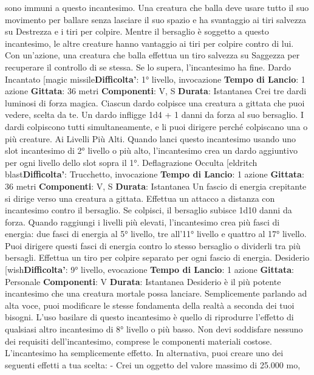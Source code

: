 \begin{multicols}{2}
sono immuni a questo incantesimo.
Una creatura che balla deve usare tutto il suo
movimento per ballare senza lasciare il suo spazio e ha
svantaggio ai tiri salvezza su Destrezza e i tiri per
colpire. Mentre il bersaglio è soggetto a questo
incantesimo, le altre creature hanno vantaggio ai tiri per
colpire contro di lui. Con un’azione, una creatura che
balla effettua un tiro salvezza su Saggezza per
recuperare il controllo di se stessa. Se lo supera,
l’incantesimo ha fine.
Dardo Incantato
[magic missile\textbf{Difficolta'}:
1° livello, invocazione
\textbf{Tempo di Lancio}: 1 azione
\textbf{Gittata}: 36 metri
\textbf{Componenti}: V, S
\textbf{Durata}: Istantanea
Crei tre dardi luminosi di forza magica. Ciascun dardo
colpisce una creatura a gittata che puoi vedere, scelta
da te. Un dardo infligge 1d4 + 1 danni da forza al suo
bersaglio. I dardi colpiscono tutti simultaneamente, e li
puoi dirigere perché colpiscano una o più creature.
Ai Livelli Più Alti. Quando lanci questo incantesimo
usando uno slot incantesimo di 2° livello o più alto,
l’incantesimo crea un dardo aggiuntivo per ogni livello
dello slot sopra il 1°.
Deflagrazione Occulta
[eldritch blast\textbf{Difficolta'}:
Trucchetto, invocazione
\textbf{Tempo di Lancio}: 1 azione
\textbf{Gittata}: 36 metri
\textbf{Componenti}: V, S
\textbf{Durata}: Istantanea
Un fascio di energia crepitante si dirige verso una
creatura a gittata. Effettua un attacco a distanza con 
incantesimo contro il bersaglio. Se colpisci, il bersaglio
subisce 1d10 danni da forza.
Quando raggiungi i livelli più elevati, l’incantesimo crea
più fasci di energia: due fasci di energia al 5° livello, tre
all’11° livello e quattro al 17° livello. Puoi dirigere questi
fasci di energia contro lo stesso bersaglio o dividerli tra
più bersagli. Effettua un tiro per colpire separato per
ogni fascio di energia.
Desiderio
[wish\textbf{Difficolta'}:
9° livello, evocazione
\textbf{Tempo di Lancio}: 1 azione
\textbf{Gittata}: Personale
\textbf{Componenti}: V
\textbf{Durata}: Istantanea
Desiderio è il più potente incantesimo che una creatura
mortale possa lanciare. Semplicemente parlando ad
alta voce, puoi modificare le stesse fondamenta della
realtà a seconda dei tuoi bisogni.
L’uso basilare di questo incantesimo è quello di
riprodurre l’effetto di qualsiasi altro incantesimo di 8°
livello o più basso. Non devi soddisfare nessuno dei
requisiti dell’incantesimo, comprese le componenti
materiali costose. L’incantesimo ha semplicemente
effetto.
In alternativa, puoi creare uno dei seguenti effetti a tua
scelta:
- Crei un oggetto del valore massimo di 25.000 mo,

\end{multicols}
